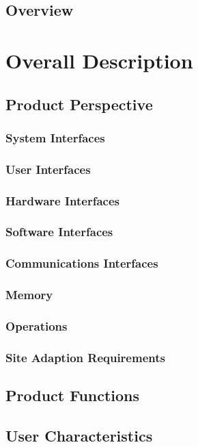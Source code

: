 \documentclass[12pt]{article}
\begin{document}
	\subsection{Overview}
	
	\section{Overall Description}
	\subsection{Product Perspective}
	\subsubsection{System Interfaces}
	\subsubsection{User Interfaces}
	\subsubsection{Hardware Interfaces}
	
	\subsubsection{Software Interfaces}
	\subsubsection{Communications Interfaces}
	\subsubsection{Memory}
	\subsubsection{Operations}
	
	\subsubsection{Site Adaption Requirements}
	\subsection{Product Functions}
	\subsection{User Characteristics}
\end{document}
